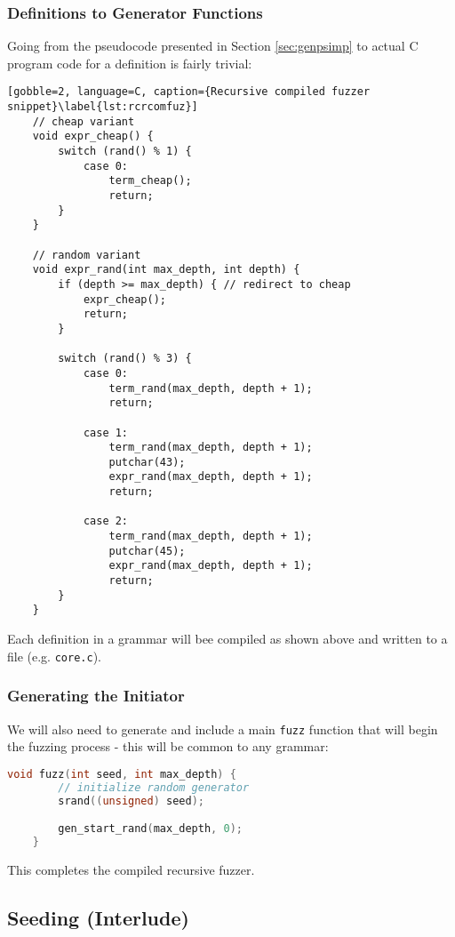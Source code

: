 \documentclass[8pt, twoside]{extarticle}
\begin{document}
\subsubsection{Definitions to Generator Functions}

Going from the pseudocode presented in Section \ref{sec:genpsimp} to actual C program code for a definition is fairly trivial:

\begin{lstlisting}[gobble=2, language=C, caption={Recursive compiled fuzzer snippet}\label{lst:rcrcomfuz}]
	// cheap variant
	void expr_cheap() {
		switch (rand() % 1) {
			case 0:
				term_cheap();
				return;
		}
	}

	// random variant
	void expr_rand(int max_depth, int depth) {
		if (depth >= max_depth) { // redirect to cheap
			expr_cheap();
			return;
		}

		switch (rand() % 3) {
			case 0:
				term_rand(max_depth, depth + 1);
				return;
			
			case 1:
				term_rand(max_depth, depth + 1);
				putchar(43);
				expr_rand(max_depth, depth + 1);
				return;

			case 2:
				term_rand(max_depth, depth + 1);
				putchar(45);
				expr_rand(max_depth, depth + 1);
				return;
		}
	}
\end{lstlisting}

Each definition in a grammar will bee compiled as shown above and written to a file (e.g. \verb|core.c|). 

\subsubsection{Generating the Initiator}

We will also need to generate and include a main \verb|fuzz| function that will begin the fuzzing process - this will be common to any grammar:

\begin{lstlisting}[gobble=2, language=C, caption={Recursive compiled fuzzer initiator}]
	void fuzz(int seed, int max_depth) {
		// initialize random generator
		srand((unsigned) seed);

		gen_start_rand(max_depth, 0);
	}
\end{lstlisting}

This completes the compiled recursive fuzzer.

\subsection{Seeding (Interlude)}
\end{document}
